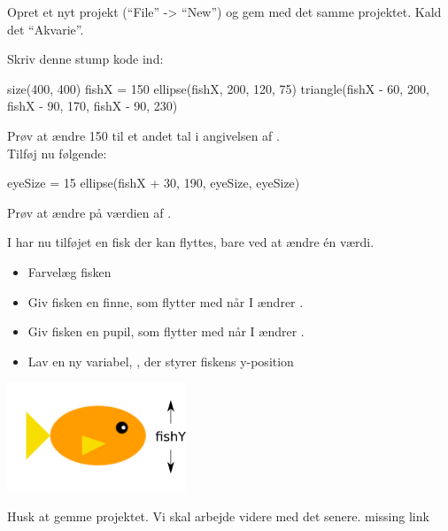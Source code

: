 \documentclass{ucph-handout}
\newcounter{handout}
\begin{document}
\newpage
{}
\begin{exercisebox}[adjusted title=Variable]
Opret et nyt projekt (``File'' -> ``New'') og gem med det samme
projektet. Kald det ``Akvarie''.

\noindent
Skriv denne stump kode ind:
\begin{python}
size(400, 400)
fishX = 150
ellipse(fishX, 200, 120, 75)
triangle(fishX - 60, 200, fishX - 90, 170, fishX - 90, 230)
\end{python}
Prøv at ændre 150 til et andet tal i angivelsen af .\\

\noindent
Tilføj nu følgende:
\begin{python}
eyeSize = 15
ellipse(fishX + 30, 190, eyeSize, eyeSize)
\end{python}
Prøv at ændre på værdien af .

\noindent
I har nu tilføjet en fisk der kan flyttes, bare ved at ændre én
værdi.

\begin{itemize}
\item Farvelæg fisken
\item Giv fisken en finne, som flytter med når I ændrer .
\item Giv fisken en pupil, som flytter med når I ændrer .
\item Lav en ny variabel, , der styrer fiskens y-position
\end{itemize}
\hspace{1cm}\includegraphics[width=0.4\textwidth]{illustrationer/fisk-fishY.png}

\noindent
Husk at gemme projektet. Vi skal arbejde videre med det senere.
missing link
\end{exercisebox}
\newpage
\end{document}
